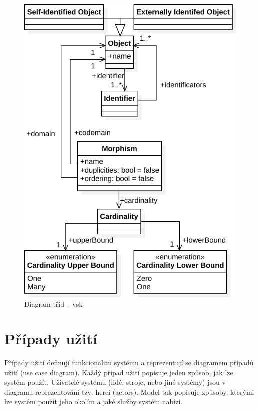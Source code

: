 \begin{figure}[!htb]
  \centering
  \includegraphics[width=\maxwidth{\textwidth}]{../img/diagrams/scv-model.pdf}
  \caption{Diagram tříd -- \acrlong{vsk}}
  \label{fig:class-diagram:scv}
\end{figure}

\section{Případy užití}

Případy užití definují funkcionalitu systému a reprezentují se diagramem případů užití (use case diagram).
Každý případ užití popisuje jeden způsob, jak lze systém použít.
Uživatelé systému (lidé, stroje, nebo jiné systémy) jsou v diagramu reprezentováni tzv. herci (actors).
Model tak popisuje způsoby, kterými lze systém použít jeho okolím a jaké služby systém nabízí.~\cite[s.~65]{overgaard_usecases_2005}

